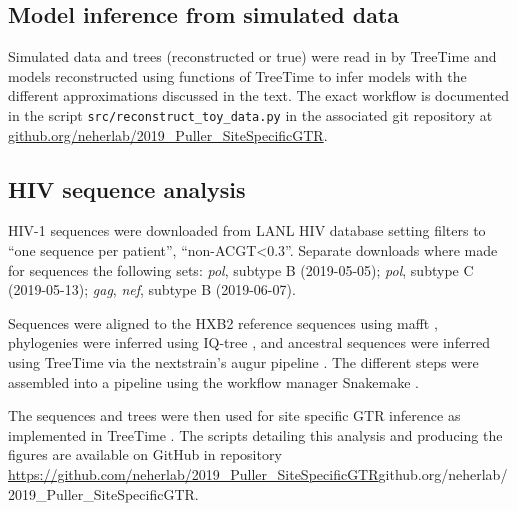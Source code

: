 \documentclass[aps,rmp,twocolumn]{revtex4}
\newcommand{\gene}[1]{{\it #1}}
\begin{document}
\subsection*{Model inference from simulated data}
Simulated data and trees (reconstructed or true) were read in by TreeTime and models reconstructed using functions of TreeTime to infer models with the different approximations discussed in the text.
The exact workflow is documented in the script \texttt{src/reconstruct\_toy\_data.py} in the associated git repository at \href{https://github.com/neherlab/2019_Puller_SiteSpecificGTR}{github.org/neherlab/2019\_Puller\_SiteSpecificGTR}.

\subsection*{HIV sequence analysis}
HIV-1 sequences were downloaded from LANL HIV database \citep{LANL} setting filters to ``one sequence per patient'', ``non-ACGT\textless 0.3''.
Separate downloads where made for sequences the following sets: \gene{pol}, subtype B (2019-05-05); \gene{pol}, subtype C (2019-05-13); \gene{gag}, \gene{nef}, subtype B (2019-06-07).

Sequences were aligned to the HXB2 reference sequences using mafft \citep{katoh2013mafft}, phylogenies were inferred using IQ-tree \citep{nguyen_iq-tree:_2015}, and ancestral sequences were inferred using TreeTime \citep{sagulenko2017treetime} via the nextstrain's augur pipeline \citep{hadfield_nextstrain:_2018}.
The different steps were assembled into a pipeline using the workflow manager Snakemake \citep{koster_snakemakescalable_2012}.

The sequences and trees were then used for site specific GTR inference as implemented in TreeTime \citep{sagulenko2017treetime}.
The scripts detailing this analysis and producing the figures are available on GitHub in repository \url{https://github.com/neherlab/2019_Puller_SiteSpecificGTR}{github.org/neherlab/2019\_Puller\_SiteSpecificGTR}.

\clearpage
\appendix
\renewcommand{\thefigure}{S\arabic{figure}}
\renewcommand{\thetable}{S\arabic{table}}
\setcounter{figure}{0}
\setcounter{table}{0}
\end{document}
